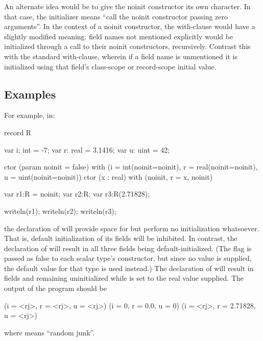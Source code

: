 An alternate idea would be to give the noinit constructor its own character.  In that
case, the  initializer means ``call the noinit constructor passing zero
arguments''.  In the context of a noinit constructor, the with-clause would have a
slightly modified meaning: field names not mentioned explicitly would be initialized
through a call to their noinit constructors, recursively.  Contrast this with the standard
with-clause, wherein if a field name is unmentioned it is initialized using that field's
class-scope or record-scope initial value.


\subsection{Examples}
\label{noinit_Examples}

For example, in:
\begin{chapel}
record R {
  var i: int = -7;
  var r: real = 3.1416;
  var u: uint = 42;

  ctor (param noinit = false) 
  with (i = int(noinit=noinit), r = real(noinit=noinit), u = uint(noinit=noinit)) 
  {}
  ctor (x : real) with (noinit, r = x, noinit) {}
}

var r1:R = noinit;
var r2:R;
var r3:R(2.71828);

writeln(r1);
writeln(r2);
writeln(r3);
\end{chapel}
\noindent
the declaration of  will provide space for  but perform no initialization
whatsoever.  That is, default initialization of its fields will be inhibited.  In
contrast, the declaration of  will result in all three fields being
default-initialized.  (The  flag is passed as false to each scalar type's
constructor, but since no value is supplied, the default value for that type is used
instead.)  The declaration of  will result in fields  and
 remaining uninitialized while  is set to the real value supplied.  The
output of the program should be
\begin{chapelprintoutput}
(i = <rj>, r = <rj>, u = <rj>)
(i = 0, r = 0.0, u = 0)
(i = <rj>, r = 2.71828, u = <rj>)
\end{chapelprintoutput}
where  means ``random junk''.

